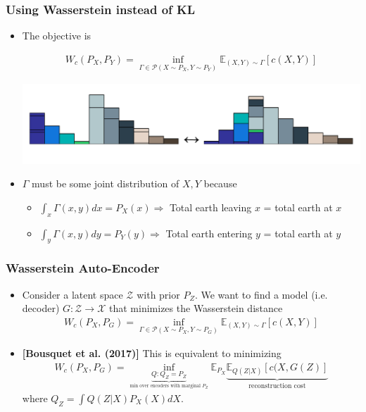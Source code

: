 \documentclass{beamer}
\newcommand{\E}{\mathbb{E}}
\newcommand{\col}[1]{\textcolor{lred}{#1}}
\begin{document}
\begin{frame}
\frametitle{Using Wasserstein instead of KL}
\begin{itemize}
\setlength\itemsep{1em}

\item The objective is 

\begin{align*}
W_c(P_X, P_Y) = \inf_{\Gamma \in \mathcal{P}(X \sim P_X, Y \sim P_Y)} \E_{(X, Y) \sim \Gamma} [c(X, Y)]
\end{align*}

\pause

\begin{center}
\includegraphics[scale=0.4]{discrete-em3}
\end{center}

\pause 

\item $\Gamma$ must be some joint distribution of $X, Y$ because 
\begin{itemize}
\item $\int_{x} \Gamma(x, y) dx = P_X(x) \Rightarrow $ Total earth leaving $x$ = total earth at $x$  
\item $\int_{y} \Gamma(x, y) dy = P_Y(y) \Rightarrow $ Total earth entering $y$ = total earth at $y$
\end{itemize}

\end{itemize}
\end{frame}

\begin{frame}
\frametitle{Wasserstein Auto-Encoder}
\begin{itemize}
\setlength\itemsep{1em}
\item Consider a latent space $\mathcal{Z}$ with prior $P_Z$.  We want to find a model (i.e. decoder) $G: \mathcal{Z} \to \mathcal{X}$ that minimizes the \col{Wasserstein distance}
\begin{align*}
W_c(P_X, P_G) = \inf_{\Gamma \in \mathcal{P}(X \sim P_X, Y \sim P_G)} \E_{(X, Y) \sim \Gamma} [c(X, Y)]
\end{align*}

\pause

\item \textbf{[Bousquet et al. (2017)]}  This is equivalent to minimizing 
\begin{align*}
W_c(P_X, P_G) = \inf_{\underbrace{Q: Q_Z = P_Z}_{\text{min over encoders with marginal $P_Z$}}} \E_{P_X} \underbrace{\E_{Q(Z \vert X)} [c(X, G(Z)]}_{\text{reconstruction cost}}
\end{align*}
where $Q_Z = \int Q(Z \vert X) P_X(X) dX$.  
\end{itemize}
\end{frame}
\end{document}
